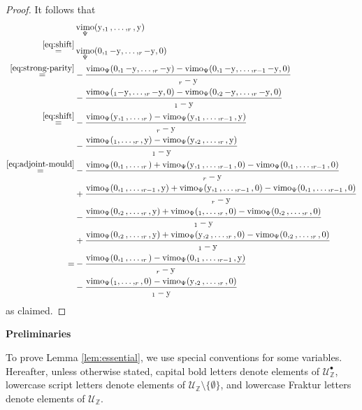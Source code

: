 \documentclass[15pt,oneside,reqno]{amsart}
\theoremstyle{remark}{
\newtheorem{lem}[df]{Lemma}
\newtheorem{prop}[df]{Proposition}
\newtheorem{ex}[df]{Example}
\newtheorem{rmk}[df]{Remark}
}
\newcommand{\Z}{\mathbb{Z}}
\DeclareMathOperator{\vimo}{vimo}
\let\x\relax
\newcommand{\x}{\mathrm{x}}
\newcommand{\y}{\mathrm{y}}
\newcommand{\nsubsection}[1]{%
  \par\bigskip
  \noindent\textbf{#1}\par
  \medskip
}
\begin{document}
\begin{proof}
It follows that
\begin{align*}
&\vimo_{\Psi}(\y,\x_1,\ldots,\x_r,\y) \\
\stackrel{\eqref{eq:shift}}{=} & \vimo_{\Psi}(0,\x_1-\y,\ldots,\x_r-\y,0)\\
\stackrel{\eqref{eq:strong-parity}}{=}& -\frac{\vimo_{\Psi }(0,\x_1-\y,\ldots,\x_r-\y) - \vimo_{\Psi }(0,\x_1-\y,\ldots,\x_{r-1}-\y,0)}{\x_r-\y} \\
&- \frac{\vimo_{\Psi }(\x_1-\y,\ldots,\x_r-\y,0) - \vimo_{\Psi }(0,\x_2-\y,\ldots,\x_{r}-\y,0)}{\x_1-\y}\\
\stackrel{\eqref{eq:shift}}{=} & -\frac{\vimo_{\Psi }(\y,\x_1,\ldots,\x_r) - \vimo_{\Psi }(\y,\x_1,\ldots,\x_{r-1},\y)}{\x_r-\y} \\
&- \frac{\vimo_{\Psi }(\x_1,\ldots,\x_r,\y) - \vimo_{\Psi }(\y,\x_2,\ldots,\x_{r},\y)}{\x_1-\y}\\
\stackrel{\eqref{eq:adjoint-mould}}{=} &  -\frac{\vimo_{\Psi }(0,\x_1,\ldots,\x_r) + \vimo_{\Psi }(\y,\x_1,\ldots,\x_{r-1},0) - \vimo_{\Psi }(0,\x_1,\ldots,\x_{r-1},0)}{\x_r-\y}\\
& + \frac{\vimo_{\Psi }(0,\x_1,\ldots,\x_{r-1},\y) + \vimo_{\Psi }(\y,\x_1,\ldots,\x_{r-1},0) - \vimo_{\Psi }(0,\x_1,\ldots,\x_{r-1},0)}{\x_r-\y}\\
&- \frac{\vimo_{\Psi }(0,\x_2,\ldots,\x_r,\y) + \vimo_{\Psi }(\x_1,\ldots,\x_r,0) - \vimo_{\Psi }(0,\x_2,\ldots,\x_r,0)}{\x_1-\y}\\
&+ \frac{\vimo_{\Psi }(0,\x_2,\ldots,\x_{r},\y) + \vimo_{\Psi }(\y,\x_2,\ldots,\x_{r},0) - \vimo_{\Psi }(0,\x_2,\ldots,\x_{r},0) }{\x_1-\y}\\
=& -\frac{\vimo_{\Psi }(0,\x_1,\ldots,\x_r) - \vimo_{\Psi }(0,\x_1,\ldots,\x_{r-1},\y)}{\x_r - \y} \\
&- \frac{\vimo_{\Psi }(\x_1,\ldots,\x_r,0) - \vimo_{\Psi }(\y,\x_2,\ldots,\x_{r},0)}{\x_1 - \y}
\end{align*}
as claimed.
\end{proof}




\nsubsection{Preliminaries}

To prove Lemma \ref{lem:essential}, we use special conventions for some variables.
Hereafter, unless otherwise stated, capital bold letters denote elements of $\mathcal{U}_{\Z}^{\bullet}$, lowercase script letters denote elements of $\mathcal{U}_{\Z} \setminus\{\emptyset\}$, and lowercase Fraktur letters denote elements of $\mathcal{U}_{\Z}$.
\end{document}
